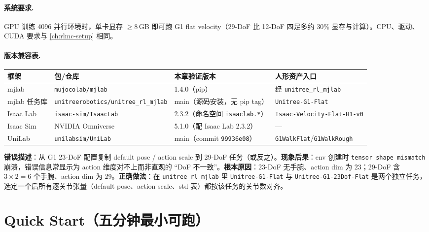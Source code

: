 \paragraph{系统要求.}
GPU 训练 4096 并行环境时，单卡显存 $\geq 8$\,GB 即可跑 G1 flat velocity（29-DoF 比 12-DoF 四足多约 $30\%$ 显存与计算）。CPU、驱动、CUDA 要求与 \cref{ch:rlmc-setup} 相同。

\paragraph{版本兼容表.}

\begin{center}
\small
\begin{tabular}{llll}
\hline
框架 & 包/仓库 & 本章验证版本 & 人形资产入口 \\
\hline
mjlab & \texttt{mujocolab/mjlab} & 1.4.0（pip） & 经 \texttt{unitree\_rl\_mjlab} \\
mjlab 任务库 & \texttt{unitreerobotics/unitree\_rl\_mjlab} & main（源码安装，无 pip tag）& \texttt{Unitree-G1-Flat} \\
Isaac Lab & \texttt{isaac-sim/IsaacLab} & 2.3.2（命名空间 \texttt{isaaclab.*}）& \texttt{Isaac-Velocity-Flat-H1-v0} \\
Isaac Sim & NVIDIA Omniverse & 5.1.0（配 Isaac Lab 2.3.2）& --- \\
UniLab & \texttt{unilabsim/UniLab} & main（commit \texttt{99936e08}）& \texttt{G1WalkFlat}/\texttt{G1WalkRough} \\
\hline
\end{tabular}
\end{center}

\begin{pitfall}
\textbf{错误描述}：从 G1 23-DoF 配置复制 default pose / action scale 到 29-DoF 任务（或反之）。\textbf{现象后果}：env 创建时 \verb|tensor shape mismatch| 崩溃，错误信息常显示为 action 维度对不上而非直观的 “DoF 不一致”。\textbf{根本原因}：23-DoF 无手腕、action dim 为 23；29-DoF 含 $3\times2=6$ 个手腕、action dim 为 29。\textbf{正确做法}：在 \texttt{unitree\_rl\_mjlab} 里 \texttt{Unitree-G1-Flat} 与 \texttt{Unitree-G1-23Dof-Flat} 是两个独立任务，选定一个后所有逐关节张量（default pose、action scale、std 表）都按该任务的关节数对齐。
\end{pitfall}

\section*{Quick Start（五分钟最小可跑）}

